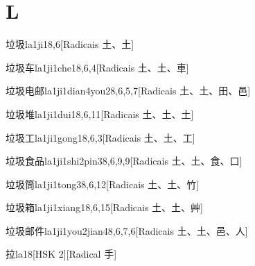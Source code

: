
\section*{L}

\begin{entry}{垃圾}{la1ji1}{8,6}[Radicais ⼟、⼟]
\end{entry}

\begin{entry}{垃圾车}{la1ji1che1}{8,6,4}[Radicais ⼟、⼟、⾞]
\end{entry}

\begin{entry}{垃圾电邮}{la1ji1dian4you2}{8,6,5,7}[Radicais ⼟、⼟、⽥、⾢]
\end{entry}

\begin{entry}{垃圾堆}{la1ji1dui1}{8,6,11}[Radicais ⼟、⼟、⼟]
\end{entry}

\begin{entry}{垃圾工}{la1ji1gong1}{8,6,3}[Radicais ⼟、⼟、⼯]
\end{entry}

\begin{entry}{垃圾食品}{la1ji1shi2pin3}{8,6,9,9}[Radicais ⼟、⼟、⾷、⼝]
\end{entry}

\begin{entry}{垃圾筒}{la1ji1tong3}{8,6,12}[Radicais ⼟、⼟、⽵]
\end{entry}

\begin{entry}{垃圾箱}{la1ji1xiang1}{8,6,15}[Radicais ⼟、⼟、⾋]
\end{entry}

\begin{entry}{垃圾邮件}{la1ji1you2jian4}{8,6,7,6}[Radicais ⼟、⼟、⾢、⼈]
\end{entry}

\begin{entry}{拉}{la1}{8}[HSK 2][Radical ⼿]
\end{entry}

